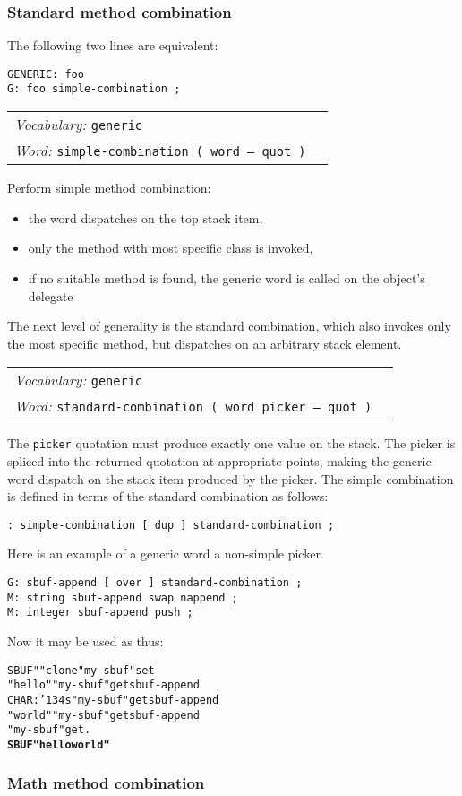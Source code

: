 \documentclass{book}
\newcommand{\bs}{\char'134}
\newcommand{\vocabulary}[1]{\emph{Vocabulary:} \texttt{#1}&\\}
\newcommand{\ordinaryword}[2]{\index{\texttt{#1}}\emph{Word:} \texttt{#2}&\\}
\newcommand{\wordtable}[1]{


\begin{tabularx}{12cm}{lX}
\hline
#1
\hline
\end{tabularx}

}
\begin{document}
\subsubsection{Standard method combination}

The following two lines are equivalent:
\begin{verbatim}
GENERIC: foo
G: foo simple-combination ;
\end{verbatim}
\wordtable{
\vocabulary{generic}
\ordinaryword{simple-combination}{simple-combination~( word -- quot )}
}
Perform simple method combination:
\begin{itemize}
\item the word dispatches on the top stack item,
\item only the method with most specific class is invoked,
\item if no suitable method is found, the generic word is called on the object's delegate
\end{itemize}

The next level of generality is the standard combination, which also invokes only the most specific method, but dispatches on an arbitrary stack element.
\wordtable{
\vocabulary{generic}
\ordinaryword{standard-combination}{standard-combination~( word picker -- quot )}
}
The \verb|picker| quotation must produce exactly one value on the stack. The picker is spliced into the returned quotation at appropriate points, making the generic word dispatch on the stack item produced by the picker. The simple combination is defined in terms of the standard combination as follows:
\begin{verbatim}
: simple-combination [ dup ] standard-combination ;
\end{verbatim}
Here is an example of a generic word a non-simple picker.
\begin{verbatim}
G: sbuf-append [ over ] standard-combination ;
M: string sbuf-append swap nappend ;
M: integer sbuf-append push ;
\end{verbatim}
Now it may be used as thus:
\begin{alltt}
  SBUF" " clone "my-sbuf" set
  "hello" "my-sbuf" get sbuf-append
  CHAR: \bs{}s "my-sbuf" get sbuf-append
  "world" "my-sbuf" get sbuf-append
  "my-sbuf" get .
\textbf{SBUF" hello world"}
\end{alltt}

\subsubsection{Math method combination}
\newcommand{\numupgradeglos}{
}
\numupgradeglos
\end{document}
